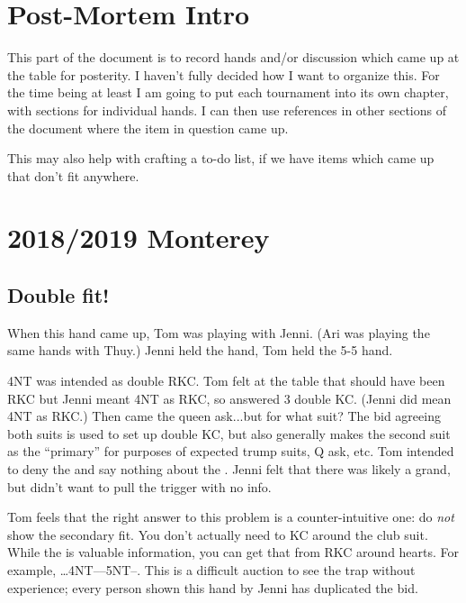 \documentclass[tom-ari]{subfile}
\begin{document}
	
	\chapter{Post-Mortem Intro}
	
	This part of the document is to record hands and/or discussion which came up at the table for posterity.  I haven't fully decided how I want to organize this.  For the time being at least I am going to put each tournament into its own chapter, with sections for individual hands.  I can then use references in other sections of the document where the item in question came up.
	
	This may also help with crafting a to-do list, if we have items which came up that don't fit anywhere.
	
	\chapter{2018/2019 Monterey}
	
	\section{Double fit!}
	
	 
	
	When this hand came up, Tom was playing with Jenni.  (Ari was playing the same hands with Thuy.)  Jenni held the  hand, Tom held the 5-5 hand.
	
	4NT was intended as double RKC. Tom felt at the table that  should have been RKC but Jenni meant 4NT as RKC, so answered 3 double KC.  (Jenni did mean 4NT as RKC.)  Then came the queen ask...but for what suit?  The  bid agreeing both suits is used to set up double KC, but also generally makes the second suit as the ``primary'' for purposes of expected trump suits, Q ask, etc.  Tom intended  to deny the  and say nothing about the .  Jenni felt that there was likely a grand, but didn't want to pull the trigger with no info.
	
	Tom feels that the right answer to this problem is a counter-intuitive one:  do \emph{not} show the secondary fit.  You don't actually need to KC around the club suit.  While the  is valuable information, you can get that from RKC around hearts.  For example, \ldots4NT----5NT--.  This is a difficult auction to see the trap without experience; every person shown this hand by Jenni has duplicated the  bid.  
	
\end{document}
